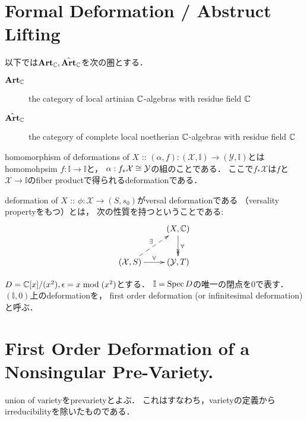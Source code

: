 \documentclass[a4paper]{jsarticle}
\newcommand{\dualnum}{\mathbb{I}}
\newcommand{\famX}{\mathcal{X}}
\newcommand{\famY}{\mathcal{Y}}
\newcommand{\Art}{\mathbf{Art}_{\C}}
\newcommand{\cArt}{\hat{\mathbf{Art}}_{\C}}
\begin{document}
\section{Formal Deformation / Abstruct Lifting}
    以下では$\Art, \cArt$を次の圏とする．
    \begin{description}
        \item[$\Art$] the category of local artinian $\mathbb{C}$-algebras with residue field $\mathbb{C}$
        \item[$\cArt$]the category of complete local noetherian $\mathbb{C}$-algebras with residue field $\mathbb{C}$
    \end{description}

    \begin{Def}
    \end{Def}

    \begin{Def}
        homomorphism of deformations of $X$ ::
        $(\alpha, f): (\famX, \dualnum) \to (\famY, \dualnum)$とは
        homomohpsim $f: \dualnum \to \dualnum$と，
        $\alpha: f_*\famX \iso \famY$の組のことである．
        ここで$f_* \famX$は$f$と$\famX \to \dualnum$のfiber productで得られるdeformationである．
    \end{Def}

    \begin{Def}
        deformation of $X$ :: $\phi: \famX \to (S, s_0)$がversal deformationである
        （versality propertyをもつ）とは，
        次の性質を持つということである:
        \[\xymatrix{
            {} & (X, \C) \ar@{->>}[d]^-{\forall} \\
            (\famX, S) \ar@{-->}[ru]^-{\exists} \ar[r]^-{\forall}& (\famY, T)
        }\]
    \end{Def}

    \begin{Def}
        $D=\mathbb{C}[x]/(x^2), \epsilon=x \bmod (x^2)$とする．
        $\dualnum=\Spec D$の唯一の閉点を$0$で表す．
        $(\dualnum, 0)$上のdeformationを，
        first order deformation (or infinitesimal deformation)と呼ぶ．
    \end{Def}

\section{First Order Deformation of a Nonsingular Pre-Variety.}
    union of varietyをprevarietyとよぶ．
    これはすなわち，varietyの定義からirreducibilityを除いたものである．
\end{document}
